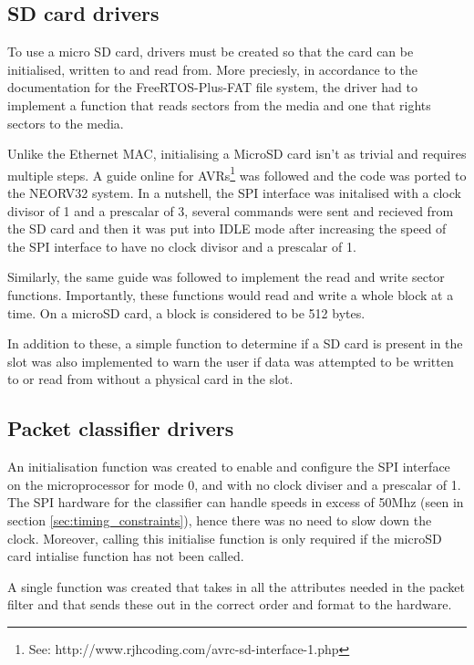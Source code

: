 \subsection{SD card drivers}

To use a micro SD card, drivers must be created so that the card can be initialised, written to and read from. More preciesly, in accordance to the  documentation for the FreeRTOS-Plus-FAT file system, the driver had to implement a function that reads sectors from the media and one that rights sectors to the media. 

Unlike the Ethernet MAC, initialising a MicroSD card isn't as trivial and requires multiple steps. A guide online for AVRs\footnote[1]{See: http://www.rjhcoding.com/avrc-sd-interface-1.php} was followed and the code was ported to the NEORV32 system. In a nutshell, the SPI interface was initalised with a clock divisor of 1 and a prescalar of 3, several commands were sent and recieved from the SD card and then it was put into IDLE mode after increasing the speed of the SPI interface to have no clock divisor and a prescalar of 1.

Similarly, the same guide was followed to implement the read and write sector functions. Importantly, these functions would read and write a whole block at a time. On a microSD card, a block is considered to be 512 bytes. 


In addition to these, a simple function to determine if a SD card is present in the slot was also implemented to warn the user if data was attempted to be written to or read from without a physical card in the slot. 








\subsection{Packet classifier drivers}

An initialisation function was created to enable and configure the SPI interface on the microprocessor for mode 0, and with no clock diviser and a prescalar of 1. The SPI hardware for the classifier can handle speeds in excess of 50Mhz (seen in section \ref{sec:timing_constraints}), hence there was no need to slow down the clock. Moreover, calling this initialise function is only required if the microSD card intialise function has not been called. 

A single function was created that takes in all the attributes needed in the packet filter and that sends these out in the correct order and format to the hardware. 




